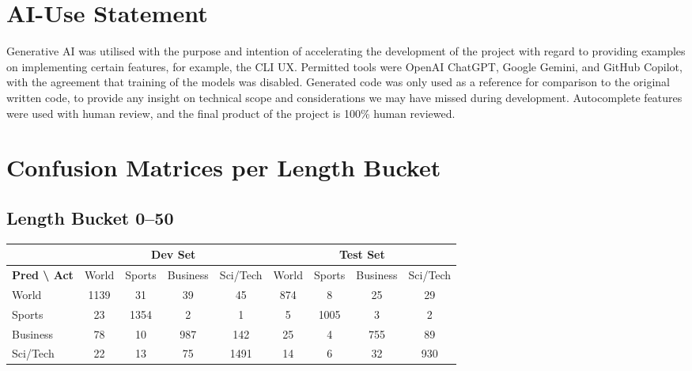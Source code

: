 \documentclass[12pt,a4paper,english]{article}
\begin{document}


 

\section{AI-Use Statement}
Generative AI was utilised with the purpose and intention of accelerating the development of the project with regard to providing examples on implementing certain features, for example, the CLI UX. Permitted tools were OpenAI ChatGPT, Google Gemini, and GitHub Copilot, with the agreement that training of the models was disabled. Generated code was only used as a reference for comparison to the original written code, to provide any insight on technical scope and considerations we may have missed during development. Autocomplete features were used with human review, and the final product of the project is 100\% human reviewed.

\section{Confusion Matrices per Length Bucket}
\label{ap:buckets}
\subsection{Length Bucket 0--50}
\begin{tabular}{|l|cccc|cccc|}
\hline
 & \multicolumn{4}{c|}{Dev Set} & \multicolumn{4}{c|}{Test Set} \\ \hline
\textbf{Pred \textbackslash{} Act} & World & Sports & Business & Sci/Tech & World & Sports & Business & Sci/Tech \\ \hline
World    & 1139 & 31  & 39  & 45  & 874 & 8   & 25  & 29 \\
Sports   & 23   & 1354& 2   & 1   & 5   & 1005& 3   & 2  \\
Business & 78   & 10  & 987 & 142 & 25  & 4   & 755 & 89 \\
Sci/Tech & 22   & 13  & 75  & 1491& 14  & 6   & 32  & 930\\ \hline
\end{tabular}
\end{document}
